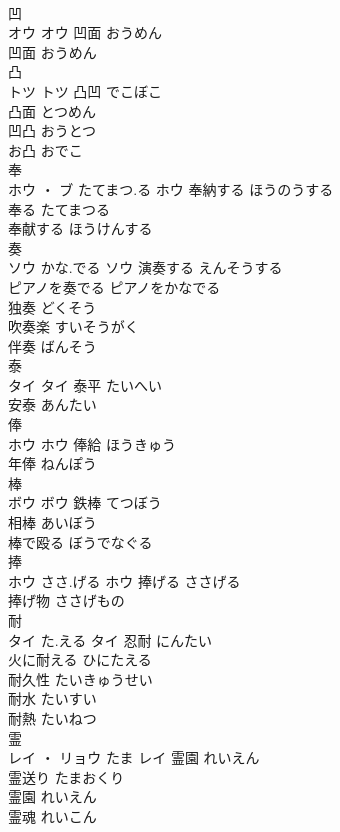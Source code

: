 \documentclass[8pt]{extreport}
\begin{document}
\begin{CJK}{UTF8}{min}
\\	凹	
\\	オウ		オウ	凹面	おうめん	
\\	凹面	おうめん	
\\	凸	
\\	トツ		トツ	凸凹	でこぼこ	
\\	凸面	とつめん	
\\	凹凸	おうとつ	
\\	お凸	おでこ	
\\	奉	
\\	ホウ ・ ブ	たてまつ.る	ホウ	奉納する	ほうのうする	
\\	奉る	たてまつる	
\\	奉献する	ほうけんする	
\\	奏	
\\	ソウ	かな.でる	ソウ	演奏する	えんそうする	
\\	ピアノを奏でる	ピアノをかなでる	
\\	独奏	どくそう	
\\	吹奏楽	すいそうがく	
\\	伴奏	ばんそう	
\\	泰	
\\	タイ		タイ	泰平	たいへい	
\\	安泰	あんたい	
\\	俸	
\\	ホウ		ホウ	俸給	ほうきゅう	
\\	年俸	ねんぽう	
\\	棒	
\\	ボウ		ボウ	鉄棒	てつぼう	
\\	相棒	あいぼう	
\\	棒で殴る	ぼうでなぐる	
\\	捧	
\\	ホウ	ささ.げる	ホウ	捧げる	ささげる	
\\	捧げ物	ささげもの	
\\	耐	
\\	タイ	た.える	タイ	忍耐	にんたい	
\\	火に耐える	ひにたえる	
\\	耐久性	たいきゅうせい	
\\	耐水	たいすい	
\\	耐熱	たいねつ	
\\	霊	
\\	レイ ・ リョウ	たま	レイ	霊園	れいえん	
\\	霊送り	たまおくり	
\\	霊園	れいえん	
\\	霊魂	れいこん	

\end{CJK}
\end{document}
